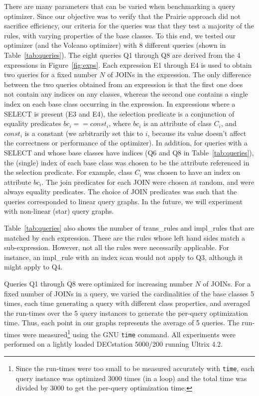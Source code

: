 There are many parameters that can be varied when benchmarking a query
optimizer.  Since our objective was to verify that the Prairie approach
did not sacrifice efficiency, our criteria for the queries was that
they test a majority of the rules, with varying properties of the base
classes.  To this end, we tested our optimizer (and the Volcano
optimizer) with 8 different queries (shown in Table~\ref{tab:queries}).
The eight queries Q1 through Q8 are derived from the 4 expressions in
Figure~\ref{fig:exps}.  Each expression E1 through E4 is used to obtain
two queries for a fixed number $N$ of JOINs in the expression.  The
only difference between the two queries obtained from an expression is
that the first one does not contain any indices on any classes, whereas
the second one contains a single index on each base class occurring in
the expression.  In expressions where a SELECT is present (E3 and E4),
the selection predicate is a conjunction of equality predicates
$\textit{bc}_i == \textit{const}_i$, where $\textit{bc}_i$ is an
attribute of class $\textit{C}_i$, and $\textit{const}_i$ is a constant
(we arbitrarily set this to $i$, because its value doesn't affect the
correctness or performance of the optimizer).  In addition, for queries
with a SELECT and whose base classes have indices (Q6 and Q8 in
Table~\ref{tab:queries}), the (single) index of each base class was
chosen to be the attribute referenced in the selection predicate.  For
example, class $\textit{C}_i$ was chosen to have an index on attribute
$\textit{bc}_i$.  The join predicates for each JOIN were chosen at
random, and were always equality predicates.  The choice of JOIN
predicates was such that the queries corresponded to linear query
graphs.  In the future, we will experiment with non-linear (\eg star)
query graphs.

Table~\ref{tab:queries} also shows the number of trans\_rules and
impl\_rules that are matched by each expression.  These are the rules
whose left hand sides match a sub-expression.  However, not all the
rules were necessarily applicable.  For instance, an impl\_rule with an
index scan would not apply to Q3, although it might apply to Q4.

Queries Q1 through Q8 were optimized for increasing number $N$ of
JOINs.  For a fixed number of JOINs in a query, we varied the
cardinalities of the base classes 5 times, each time generating a query
with different class properties, and averaged the run-times over the 5
query instances to generate the per-query optimization time.  Thus,
each point in our graphs represents the average of 5 queries.  The
run-times were measured\footnote{Since the run-times were too small to
be measured accurately with \texttt{time}, each query instance was
optimized 3000 times (in a loop) and the total time was divided by 3000
to get the per-query optimization time.} using the GNU \texttt{time}
command.  All experiments were performed on a lightly loaded DECstation
5000/200 running Ultrix 4.2.

